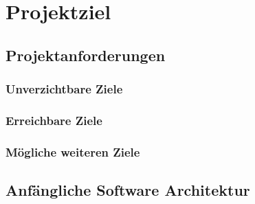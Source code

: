 
\chapter{Projektziel}

\section{Projektanforderungen}
\subsection{Unverzichtbare Ziele}

\subsection{Erreichbare Ziele}

\subsection{Mögliche weiteren Ziele}

\section{Anfängliche Software Architektur}
